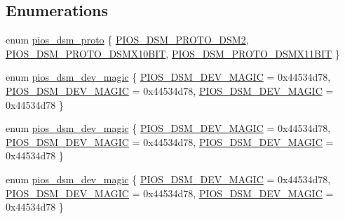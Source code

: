 \subsection*{Enumerations}
\begin{DoxyCompactItemize}
\item 
enum \hyperlink{group___p_i_o_s___d_s_m_ga0c64890f0b9cb4fd7681b2d92fad8bd9}{pios\-\_\-dsm\-\_\-proto} \{ \hyperlink{group___p_i_o_s___d_s_m_gga0c64890f0b9cb4fd7681b2d92fad8bd9ac1f20698946da8d49ca98423672c5c2f}{P\-I\-O\-S\-\_\-\-D\-S\-M\-\_\-\-P\-R\-O\-T\-O\-\_\-\-D\-S\-M2}, 
\hyperlink{group___p_i_o_s___d_s_m_gga0c64890f0b9cb4fd7681b2d92fad8bd9a72b98ff1fac8f28c46376c1b9219f229}{P\-I\-O\-S\-\_\-\-D\-S\-M\-\_\-\-P\-R\-O\-T\-O\-\_\-\-D\-S\-M\-X10\-B\-I\-T}, 
\hyperlink{group___p_i_o_s___d_s_m_gga0c64890f0b9cb4fd7681b2d92fad8bd9aac434e0720becbc427a60bae21582abd}{P\-I\-O\-S\-\_\-\-D\-S\-M\-\_\-\-P\-R\-O\-T\-O\-\_\-\-D\-S\-M\-X11\-B\-I\-T}
 \}
\item 
enum \hyperlink{group___p_i_o_s___d_s_m_gaa8fd2b8b7432f69244c6af0ffd1c3c4b}{pios\-\_\-dsm\-\_\-dev\-\_\-magic} \{ \hyperlink{group___p_i_o_s___d_s_m_ggaa8fd2b8b7432f69244c6af0ffd1c3c4ba519ec93ae372d40ba8c2958931e3ca86}{P\-I\-O\-S\-\_\-\-D\-S\-M\-\_\-\-D\-E\-V\-\_\-\-M\-A\-G\-I\-C} = 0x44534d78, 
\hyperlink{group___p_i_o_s___d_s_m_ggaa8fd2b8b7432f69244c6af0ffd1c3c4ba519ec93ae372d40ba8c2958931e3ca86}{P\-I\-O\-S\-\_\-\-D\-S\-M\-\_\-\-D\-E\-V\-\_\-\-M\-A\-G\-I\-C} = 0x44534d78, 
\hyperlink{group___p_i_o_s___d_s_m_ggaa8fd2b8b7432f69244c6af0ffd1c3c4ba519ec93ae372d40ba8c2958931e3ca86}{P\-I\-O\-S\-\_\-\-D\-S\-M\-\_\-\-D\-E\-V\-\_\-\-M\-A\-G\-I\-C} = 0x44534d78
 \}
\item 
enum \hyperlink{group___p_i_o_s___d_s_m_gaa8fd2b8b7432f69244c6af0ffd1c3c4b}{pios\-\_\-dsm\-\_\-dev\-\_\-magic} \{ \hyperlink{group___p_i_o_s___d_s_m_ggaa8fd2b8b7432f69244c6af0ffd1c3c4ba519ec93ae372d40ba8c2958931e3ca86}{P\-I\-O\-S\-\_\-\-D\-S\-M\-\_\-\-D\-E\-V\-\_\-\-M\-A\-G\-I\-C} = 0x44534d78, 
\hyperlink{group___p_i_o_s___d_s_m_ggaa8fd2b8b7432f69244c6af0ffd1c3c4ba519ec93ae372d40ba8c2958931e3ca86}{P\-I\-O\-S\-\_\-\-D\-S\-M\-\_\-\-D\-E\-V\-\_\-\-M\-A\-G\-I\-C} = 0x44534d78, 
\hyperlink{group___p_i_o_s___d_s_m_ggaa8fd2b8b7432f69244c6af0ffd1c3c4ba519ec93ae372d40ba8c2958931e3ca86}{P\-I\-O\-S\-\_\-\-D\-S\-M\-\_\-\-D\-E\-V\-\_\-\-M\-A\-G\-I\-C} = 0x44534d78
 \}
\item 
enum \hyperlink{group___p_i_o_s___d_s_m_gaa8fd2b8b7432f69244c6af0ffd1c3c4b}{pios\-\_\-dsm\-\_\-dev\-\_\-magic} \{ \hyperlink{group___p_i_o_s___d_s_m_ggaa8fd2b8b7432f69244c6af0ffd1c3c4ba519ec93ae372d40ba8c2958931e3ca86}{P\-I\-O\-S\-\_\-\-D\-S\-M\-\_\-\-D\-E\-V\-\_\-\-M\-A\-G\-I\-C} = 0x44534d78, 
\hyperlink{group___p_i_o_s___d_s_m_ggaa8fd2b8b7432f69244c6af0ffd1c3c4ba519ec93ae372d40ba8c2958931e3ca86}{P\-I\-O\-S\-\_\-\-D\-S\-M\-\_\-\-D\-E\-V\-\_\-\-M\-A\-G\-I\-C} = 0x44534d78, 
\hyperlink{group___p_i_o_s___d_s_m_ggaa8fd2b8b7432f69244c6af0ffd1c3c4ba519ec93ae372d40ba8c2958931e3ca86}{P\-I\-O\-S\-\_\-\-D\-S\-M\-\_\-\-D\-E\-V\-\_\-\-M\-A\-G\-I\-C} = 0x44534d78
 \}
\end{DoxyCompactItemize}
